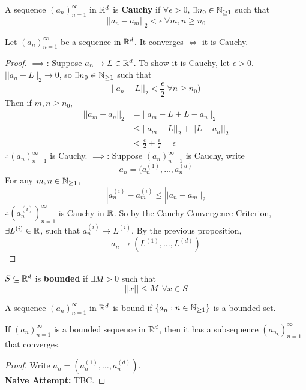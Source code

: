 \documentclass[openany]{report}
\begin{document}
\begin{definition}
    A sequence $(a_n)_{n=1}^\infty$ in $\mathbb{R}^d$ is \textbf{Cauchy} if  $\forall \epsilon > 0$, $\exists n_0 \in \mathbb{N}_{\geq 1}$ such that 
    $$||a_n - a_m||_2 < \epsilon \ \forall m,n \geq n_0$$
\end{definition}

\begin{theorem}
Let $(a_n)_{n=1}^\infty$ be a sequence in $\mathbb{R}^d$. It converges $\iff$ it is Cauchy.
\end{theorem}

\begin{proof}
    $\implies$: Suppose $a_n \rightarrow L \in \mathbb{R}^d$. To show it is Cauchy, let $\epsilon > 0$. $||a_n - L||_2 \rightarrow 0$, so $\exists n_0 \in \mathbb{N}_{\geq 1}$ such that 
    $$||a_n - L||_2 < \frac{\epsilon}{2} \ \forall n \geq n_0)$$
    Then if $m,n \geq n_0$, 
    \begin{align*}
        ||a_m - a_n||_2 &= ||a_m - L + L - a_n||_2\\
        &\leq ||a_m - L||_2 + ||L - a_n||_2\\
        &< \frac{\epsilon}{2} + \frac{\epsilon}{2} = \epsilon
    \end{align*}
        $\therefore (a_n)_{n=1}^\infty$ is Cauchy.
    $\implies$: Suppose $(a_n)_{n=1}^\infty$ is Cauchy, write 
    $$a_n = (a_n^{(1)}, \dots, a_n^{(d)}$$
    For any $m,n \in \mathbb{N}_{\geq 1}$,
    $$|a_n^{(i)} - a_m^{(i)} \leq ||a_n - a_m||_2$$
    $\therefore (a_n^{(i)})_{n=1}^\infty$ is Cauchy in $\mathbb{R}$. So by the Cauchy Convergence Criterion, $\exists L^{(i)} \in \mathbb{R}$, such that $a_n^{(i)} \rightarrow L^{(i)}$. By the previous proposition,
    $$a_n \rightarrow (L^{(1)}, \dots, L^{(d)})$$
\end{proof}
\begin{definition}
    $S \subseteq \mathbb{R}^d$ is \textbf{bounded} if $\exists M > 0$ such that 
    $$||x|| \leq M \ \ \forall x \in S$$
\end{definition}
A sequence $(a_n)_{n=1}^\infty$ in $\mathbb{R}^d$ is bound if
$\{a_n: n \in \mathbb{N}_{\geq 1}\}$ is a bounded set.
\begin{theorem}
    If $(a_n)_{n=1}^\infty$ is a bounded sequence in $\mathbb{R}^d$, then it has a subsequence $(a_{n_k})_{n=1}^\infty$ that converges.
\end{theorem}
\begin{proof}
    Write $a_n = (a_n^{(1)}, \dots, a_n^{(d)})$.\\ 
    \textbf{Naive Attempt:} TBC.
\end{proof}
\end{document}
